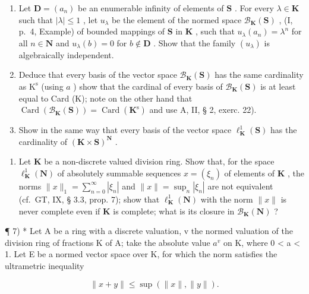 \begin{enumerate}
\def\labelenumi{\alph{enumi})}
\item
  Let \(\mathbf{D} = (a_n)\) be an enumerable infinity of elements of \(\mathbf{S}\) . For every \(\lambda \in \mathbf{K}\) such that \(|\lambda| \leqslant 1\) , let \(u_{\lambda}\) be the element of the normed space \(\mathcal{B}_{\mathbf{K}}(\mathbf{S})\) , (I, p.~4, Example) of bounded mappings of \(\mathbf{S}\) in \(\mathbf{K}\) , such that \(u_{\lambda}(a_n) = \lambda^n\) for all \(n \in \mathbf{N}\) and \(u_{\lambda}(b) = 0\) for \(b \notin \mathbf{D}\) . Show that the family \((u_{\lambda})\) is algebraically independent.
\item
  Deduce that every basis of the vector space \(\mathcal{B}_{\mathbf{K}}(\mathbf{S})\) has the same cardinality as \(\mathrm{K}^{\mathrm{s}}\) (using \(a\) ) show that the cardinal of every basis of \(\mathcal{B}_{\mathbf{K}}(\mathbf{S})\) is at least equal to Card (K); note on the other hand that \(\operatorname{Card}(\mathcal{B}_{\mathbf{K}}(\mathbf{S})) = \operatorname{Card}(\mathbf{K}^{\mathrm{s}})\) and use A, II, § 2, exerc. 22).
\item
  Show in the same way that every basis of the vector space \(\ell_{\mathbf{K}}^{1}(\mathbf{S})\) has the cardinality of \((\mathbf{K}\times \mathbf{S})^{\mathbf{N}}\) .
\end{enumerate}

\begin{enumerate}
\def\labelenumi{\arabic{enumi})}
\setcounter{enumi}{5}
\tightlist
\item
  Let \(\mathbf{K}\) be a non-discrete valued division ring. Show that, for the space \(\ell_{\mathbf{K}}^{1}(\mathbf{N})\) of absolutely summable sequences \(x = (\xi_n)\) of elements of \(\mathbf{K}\) , the norms \(\| x \|_1 = \sum_{n=0}^{\infty} |\xi_n|\) and \(\| x \| = \sup_n |\xi_n|\) are not equivalent (cf.~GT, IX, § 3.3, prop. 7); show that \(\ell_{\mathbf{K}}^{1}(\mathbf{N})\) with the norm \(\| x \|\) is never complete even if \(\mathbf{K}\) is complete; what is its closure in \(\mathcal{B}_{\mathbf{K}}(\mathbf{N})\) ?
\end{enumerate}

¶ 7) * Let A be a ring with a discrete valuation, v the normed valuation of the division ring of fractions K of A; take the absolute value \(a^{v}\) on K, where 0 \textless{} a \textless{} 1. Let E be a normed vector space over K, for which the norm satisfies the ultrametric inequality

\[
\| x + y \| \leqslant \sup (\| x \|, \| y \|).
\]

